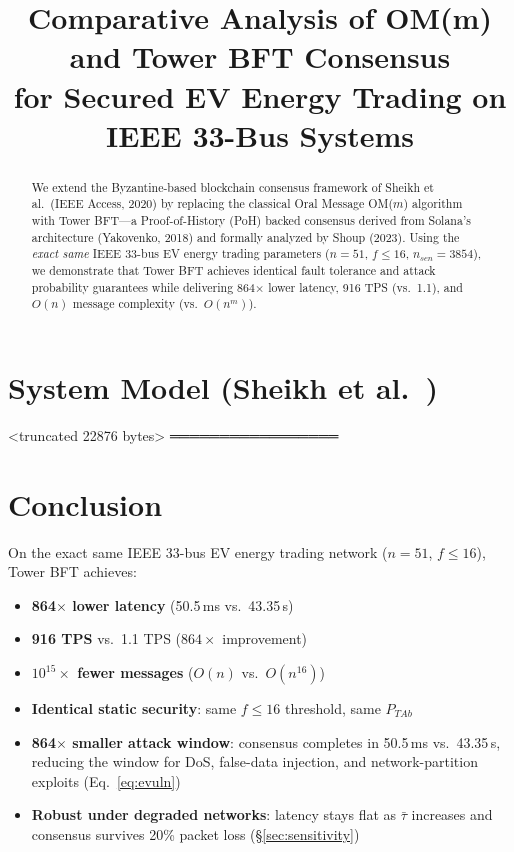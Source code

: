 \documentclass[conference]{IEEEtran}
\title{Comparative Analysis of OM(m) and Tower BFT Consensus\\for Secured EV Energy Trading on IEEE 33-Bus Systems}
\author{%
 \IEEEauthorblockN{[Your Name]}
 \IEEEauthorblockA{Veermata Jijabai Technological Institute, Mumbai, India}
 }
\begin{document}
 \maketitle
 
 \begin{abstract}
 We extend the Byzantine-based blockchain consensus framework of Sheikh et al.\ (IEEE Access, 2020)
 by replacing the classical Oral Message OM($m$) algorithm with Tower BFT---a Proof-of-History (PoH)
 backed consensus derived from Solana's architecture (Yakovenko, 2018) and formally analyzed by
 Shoup (2023). Using the \emph{exact same} IEEE 33-bus EV energy trading parameters ($n=51$,
 $f\leq16$, $n_{sen}=3854$), we demonstrate that Tower BFT achieves identical fault tolerance
 and attack probability guarantees while delivering 864$\times$ lower latency, 916 TPS (vs.\ 1.1),
 and $O(n)$ message complexity (vs.\ $O(n^m)$).
 \end{abstract}
 
 \section{System Model (Sheikh et al.\ \cite{sheikh2020})}
 
 \subse
<truncated 22876 bytes>
═════════════════
 \section{Conclusion}
 
 On the exact same IEEE 33-bus EV energy trading network ($n{=}51$, $f{\leq}16$),
 Tower BFT achieves:
 \begin{itemize}
 \item \textbf{864$\times$ lower latency} (50.5\,ms vs.\ 43.35\,s)
 \item \textbf{916 TPS} vs.\ 1.1 TPS ($864\times$ improvement)
 \item \textbf{$10^{15}\times$ fewer messages} ($O(n)$ vs.\ $O(n^{16})$)
 \item \textbf{Identical static security}: same $f{\leq}16$ threshold, same $P_{TAb}$
 \item \textbf{864$\times$ smaller attack window}: consensus completes in
       50.5\,ms vs.\ 43.35\,s, reducing the window for DoS, false-data
       injection, and network-partition exploits (Eq.~\ref{eq:evuln})
 \item \textbf{Robust under degraded networks}: latency stays flat as
       $\bar{\tau}$ increases and consensus survives 20\% packet loss
       (\S\ref{sec:sensitivity})
 \end{itemize}
 
\end{document}
